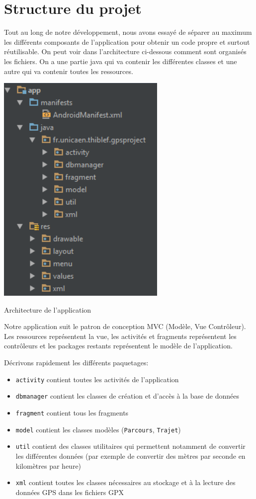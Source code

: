 \section{Structure du projet}

Tout au long de notre développement, nous avons essayé de séparer au maximum les différents composants de l'application pour obtenir un code propre et surtout réutilisable. On peut voir dans l'architecture ci-dessous comment sont organisés les fichiers. On a une partie java qui va contenir les différentes classes et une autre qui va contenir toutes les ressources.\bigskip

\begin{img}
  \includegraphics[scale=0.6]{img/archi.png}
  \caption{Architecture de l'application}
\end{img}

Notre application suit le patron de conception MVC (Modèle, Vue Contrôleur). Les ressources représentent la vue, les activités et fragments représentent les contrôleurs et les packages restants représentent le modèle de l'application.\bigskip

Décrivons rapidement les différents paquetages:\bigskip

\begin{itemize}
 	\item \verb!activity! contient toutes les activités de l'application
 	\item \verb!dbmanager! contient les classes de création et d'accès à la base de données
 	\item \verb!fragment! contient tous les fragments
 	\item \verb!model! contient les classes modèles (\verb!Parcours!, \verb!Trajet!)
 	\item \verb!util! contient des classes utilitaires qui permettent notamment de convertir les différentes données (par exemple de convertir des mètres par seconde en kilomètres par heure)
 	\item \verb!xml! contient toutes les classes nécessaires au stockage et à la lecture des données GPS dans les fichiers GPX
\end{itemize}\bigskip
 



